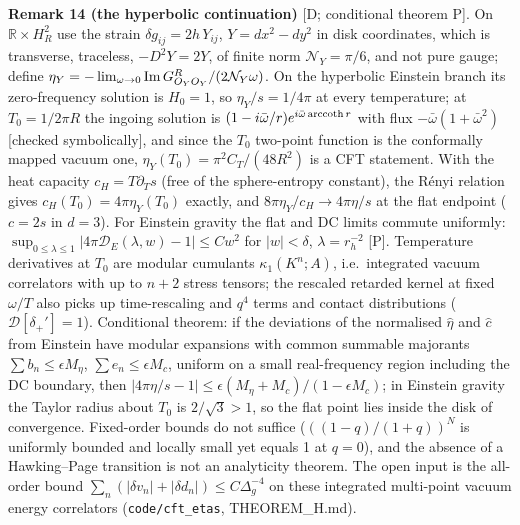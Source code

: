 \textbf{Remark 14 (the hyperbolic continuation)} [D; conditional theorem P]. On $\mathbb R\times H^2_R$ use the strain $\delta g_{ij}=2h\,Y_{ij}$, $Y=dx^2-dy^2$ in
disk coordinates, which is transverse, traceless, $-D^2Y=2Y$, of finite norm $\mathcal N_Y=\pi/6$, and not pure gauge; define
$\eta_Y=-\lim_{\omega\to0}{\rm Im}\,G^R_{O_YO_Y}/(2\mathcal N_Y\omega)$. On the hyperbolic Einstein branch its zero-frequency solution is $H_0=1$, so
$\eta_Y/s=1/4\pi$ at every temperature; at $T_0=1/2\pi R$ the ingoing solution is $(1-i\bar\omega/r)e^{i\bar\omega\,{\rm arccoth}\,r}$ with flux
$-\bar\omega(1+\bar\omega^2)$ [checked symbolically], and since the $T_0$ two-point function is the conformally mapped vacuum one,
$\eta_Y(T_0)=\pi^2C_T/(48R^2)$ is a CFT statement. With the heat capacity $c_H=T\partial_Ts$ (free of the sphere-entropy constant), the Rényi relation
gives $c_H(T_0)=4\pi\eta_Y(T_0)$ exactly, and $8\pi\eta_Y/c_H\to4\pi\eta/s$ at the flat endpoint ($c=2s$ in $d=3$). For Einstein gravity the flat and DC
limits commute uniformly: $\sup_{0\le\lambda\le1}|4\pi\mathcal D_E(\lambda,w)-1|\le Cw^2$ for $|w|<\delta$, $\lambda=r_h^{-2}$ [P]. Temperature derivatives
at $T_0$ are modular cumulants $\kappa_1(K^n;A)$, i.e.\ integrated vacuum correlators with up to $n+2$ stress tensors; the rescaled retarded kernel at
fixed $\omega/T$ also picks up time-rescaling and $q^4$ terms and contact distributions ($\mathcal D[\delta_+']=1$). Conditional theorem: if the
deviations of the normalised $\hat\eta$ and $\hat c$ from Einstein have modular expansions with common summable majorants $\sum b_n\le\epsilon M_\eta$,
$\sum e_n\le\epsilon M_c$, uniform on a small real-frequency region including the DC boundary, then $|4\pi\eta/s-1|\le\epsilon(M_\eta+M_c)/(1-\epsilon M_c)$;
in Einstein gravity the Taylor radius about $T_0$ is $2/\sqrt3>1$, so the flat point lies inside the disk of convergence. Fixed-order bounds do not
suffice ($((1-q)/(1+q))^N$ is uniformly bounded and locally small yet equals 1 at $q=0$), and the absence of a Hawking--Page transition is not an
analyticity theorem. The open input is the all-order bound $\sum_n(|\delta v_n|+|\delta d_n|)\le C\Delta_g^{-4}$ on these integrated multi-point vacuum
energy correlators (\texttt{code/cft\_etas}, THEOREM\_H.md).

